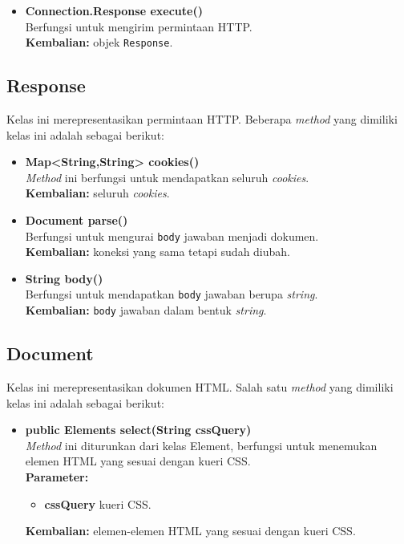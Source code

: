 \begin{itemize}
		\item \textbf{Connection.Response execute()} \\
		Berfungsi untuk mengirim permintaan HTTP.\\
		\textbf{Kembalian:} objek \texttt{Response}.	
\end{itemize}

\subsection{Response}

Kelas ini merepresentasikan permintaan HTTP. Beberapa \textit{method} yang dimiliki kelas ini adalah sebagai berikut:
\begin{itemize}
	\item \textbf{Map<String,String> cookies()} \\
		\textit{Method} ini berfungsi untuk mendapatkan seluruh \textit{cookies}. \\
		\textbf{Kembalian:} seluruh \textit{cookies}.	
		
		\item \textbf{Document parse()} \\
		Berfungsi untuk mengurai \texttt{body} jawaban menjadi dokumen. \\
		\textbf{Kembalian:} koneksi yang sama tetapi sudah diubah.
		
		\item \textbf{String body()} \\
		Berfungsi untuk mendapatkan \texttt{body} jawaban berupa \textit{string}. \\
		\textbf{Kembalian:} \texttt{body} jawaban dalam bentuk \textit{string}.
\end{itemize}

\subsection{Document}

Kelas ini merepresentasikan dokumen HTML. Salah satu \textit{method} yang dimiliki kelas ini adalah sebagai berikut:
\begin{itemize}
	\item \textbf{public Elements select(String cssQuery)} \\
		\textit{Method} ini diturunkan dari kelas Element, berfungsi untuk menemukan elemen HTML yang sesuai dengan kueri CSS. \\
		\textbf{Parameter:} 
		\begin{itemize}
			\item \textbf{cssQuery} kueri CSS.
		\end{itemize}
		\textbf{Kembalian:} elemen-elemen HTML yang sesuai dengan kueri CSS.	
\end{itemize}

